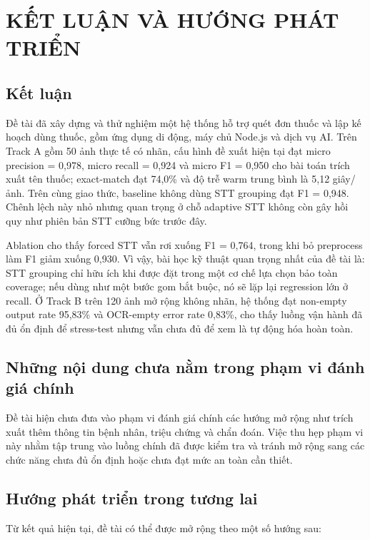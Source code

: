 \documentclass[12pt,a4paper]{report}
\begin{document}
\chapter{KẾT LUẬN VÀ HƯỚNG PHÁT TRIỂN}

\section{Kết luận}

Đề tài đã xây dựng và thử nghiệm một hệ thống hỗ trợ quét đơn thuốc và lập kế hoạch dùng thuốc, gồm ứng dụng di động, máy chủ Node.js và dịch vụ AI. Trên Track A gồm 50 ảnh thực tế có nhãn, cấu hình đề xuất hiện tại đạt micro precision = 0,978, micro recall = 0,924 và micro F1 = 0,950 cho bài toán trích xuất tên thuốc; exact-match đạt 74,0\% và độ trễ warm trung bình là 5,12 giây/ảnh. Trên cùng giao thức, baseline không dùng STT grouping đạt F1 = 0,948. Chênh lệch này nhỏ nhưng quan trọng ở chỗ adaptive STT không còn gây hồi quy như phiên bản STT cưỡng bức trước đây.

Ablation cho thấy forced STT vẫn rơi xuống F1 = 0,764, trong khi bỏ preprocess làm F1 giảm xuống 0,930. Vì vậy, bài học kỹ thuật quan trọng nhất của đề tài là: STT grouping chỉ hữu ích khi được đặt trong một cơ chế lựa chọn bảo toàn coverage; nếu dùng như một bước gom bắt buộc, nó sẽ lặp lại regression lớn ở recall. Ở Track B trên 120 ảnh mở rộng không nhãn, hệ thống đạt non-empty output rate 95,83\% và OCR-empty error rate 0,83\%, cho thấy luồng vận hành đã đủ ổn định để stress-test nhưng vẫn chưa đủ để xem là tự động hóa hoàn toàn.

\section{Những nội dung chưa nằm trong phạm vi đánh giá chính}

Đề tài hiện chưa đưa vào phạm vi đánh giá chính các hướng mở rộng như trích xuất thêm thông tin bệnh nhân, triệu chứng và chẩn đoán. Việc thu hẹp phạm vi này nhằm tập trung vào luồng chính đã được kiểm tra và tránh mở rộng sang các chức năng chưa đủ ổn định hoặc chưa đạt mức an toàn cần thiết.

\section{Hướng phát triển trong tương lai}

Từ kết quả hiện tại, đề tài có thể được mở rộng theo một số hướng sau:
\end{document}
